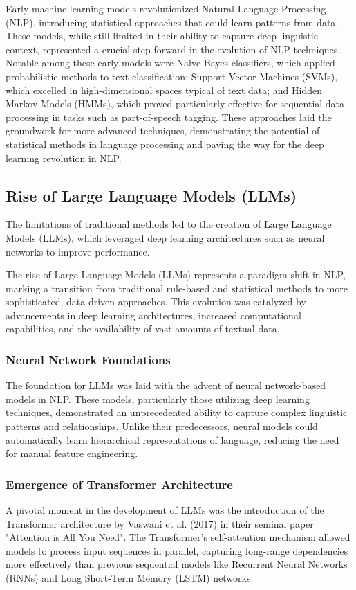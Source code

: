 Early machine learning models revolutionized Natural Language Processing (NLP), introducing statistical approaches that could learn patterns from data. These models, while still limited in their ability to capture deep linguistic context, represented a crucial step forward in the evolution of NLP techniques. Notable among these early models were Naive Bayes classifiers, which applied probabilistic methods to text classification; Support Vector Machines (SVMs), which excelled in high-dimensional spaces typical of text data; and Hidden Markov Models (HMMs), which proved particularly effective for sequential data processing in tasks such as part-of-speech tagging. These approaches laid the groundwork for more advanced techniques, demonstrating the potential of statistical methods in language processing and paving the way for the deep learning revolution in NLP.

\subsection{Rise of Large Language Models (LLMs)}
The limitations of traditional methods led to the creation of Large Language Models (LLMs), which leveraged deep learning architectures such as neural networks to improve performance.

The rise of Large Language Models (LLMs) represents a paradigm shift in NLP, marking a transition from traditional rule-based and statistical methods to more sophisticated, data-driven approaches. This evolution was catalyzed by advancements in deep learning architectures, increased computational capabilities, and the availability of vast amounts of textual data.

\subsubsection{Neural Network Foundations}
The foundation for LLMs was laid with the advent of neural network-based models in NLP. These models, particularly those utilizing deep learning techniques, demonstrated an unprecedented ability to capture complex linguistic patterns and relationships. Unlike their predecessors, neural models could automatically learn hierarchical representations of language, reducing the need for manual feature engineering.

\subsubsection{Emergence of Transformer Architecture}
A pivotal moment in the development of LLMs was the introduction of the Transformer architecture by Vaswani et al. (2017) in their seminal paper "Attention is All You Need". The Transformer's self-attention mechanism allowed models to process input sequences in parallel, capturing long-range dependencies more effectively than previous sequential models like Recurrent Neural Networks (RNNs) and Long Short-Term Memory (LSTM) networks.

